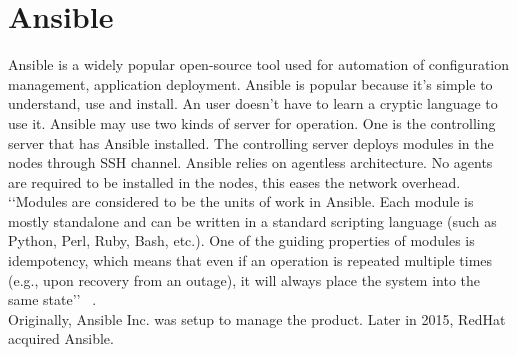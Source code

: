 \section{Ansible}

Ansible is a widely popular open-source tool used for automation of configuration management,
application deployment. Ansible is popular because it’s simple to understand, use and install.
An user doesn’t have to learn a cryptic language to use it.
Ansible may use two kinds of server for operation. One is the controlling server that has Ansible installed.
The controlling server deploys modules in the nodes through SSH channel. Ansible relies on agentless architecture.
No agents are required to be installed in the nodes, this eases the network overhead. \\
‘‘Modules are considered to be the units of work in Ansible. Each module is mostly standalone 
and can be written in a standard scripting
language (such as Python, Perl, Ruby, Bash, etc.). One of the guiding properties of 
modules is idempotency, which means that even if an
operation is repeated multiple times (e.g., upon recovery from an outage), 
it will always place the system into the same state’’
~\cite {hid-sp18-417-wiki-Ansible}. \\
Originally, Ansible Inc. was setup to manage the product. Later in 2015, RedHat acquired Ansible.
